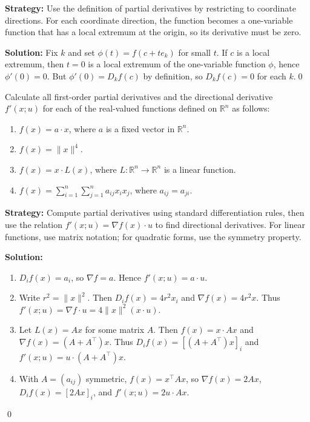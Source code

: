 \noindent\textbf{Strategy:} Use the definition of partial derivatives by restricting to coordinate directions. For each coordinate direction, the function becomes a one-variable function that has a local extremum at the origin, so its derivative must be zero.

\bigskip\noindent\textbf{Solution:}
Fix $k$ and set $\phi(t)=f(c+te_k)$ for small $t$. If $c$ is a local extremum, then $t=0$ is a local extremum of the one-variable function $\phi$, hence $\phi'(0)=0$. But $\phi'(0)=D_k f(c)$ by definition, so $D_k f(c)=0$ for each $k$.\qed


\begin{problembox}
\begin{problemstatement}
Calculate all first-order partial derivatives and the directional derivative \( f'(x; u) \) for each of the real-valued functions defined on \( \mathbb{R}^n \) as follows:
\begin{enumerate}[label=(\alph*)]
\item \( f(x) = a \cdot x \), where \( a \) is a fixed vector in \( \mathbb{R}^n \).
\item \( f(x) = \|x\|^4 \).
\item \( f(x) = x \cdot L(x) \), where \( L : \mathbb{R}^n \to \mathbb{R}^n \) is a linear function.
\item \( f(x) = \sum_{i=1}^{n} \sum_{j=1}^{n} a_{ij}x_i x_j \), where \( a_{ij} = a_{ji} \).
\end{enumerate}
\end{problemstatement}
\end{problembox}

\noindent\textbf{Strategy:} Compute partial derivatives using standard differentiation rules, then use the relation \( f'(x; u) = \nabla f(x) \cdot u \) to find directional derivatives. For linear functions, use matrix notation; for quadratic forms, use the symmetry property.

\bigskip\noindent\textbf{Solution:}
\begin{enumerate}[label=(\alph*)]
\item $D_i f(x)=a_i$, so $\nabla f=a$. Hence $f'(x;u)=a\cdot u$.
\item Write $r^2=\|x\|^2$. Then $D_i f(x)=4r^2 x_i$ and $\nabla f(x)=4r^2 x$. Thus $f'(x;u)=\nabla f\cdot u=4\|x\|^2(x\cdot u)$.
\item Let $L(x)=Ax$ for some matrix $A$. Then $f(x)=x\cdot Ax$ and $\nabla f(x)=(A+A^{\!\top})x$. Thus $D_i f(x)=[(A+A^{\!\top})x]_i$ and $f'(x;u)=u\cdot (A+A^{\!\top})x$.
\item With $A=(a_{ij})$ symmetric, $f(x)=x^{\!\top}Ax$, so $\nabla f(x)=2Ax$, $D_i f(x)=[2Ax]_i$, and $f'(x;u)=2u\cdot Ax$.
\end{enumerate}\qed


